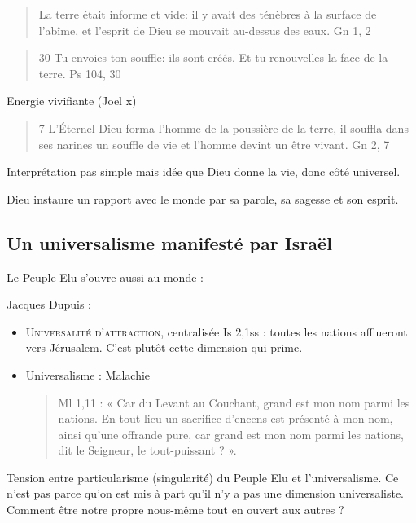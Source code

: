       \begin{quote}
      La terre était informe et vide: il y avait des ténèbres à la surface de l'abîme, et l'esprit de Dieu se mouvait au-dessus des eaux.
          Gn 1, 2 
      \end{quote}
      
      \begin{quote}
      30 Tu envoies ton souffle: ils sont créés, Et tu renouvelles la face de la terre.
          Ps 104, 30
      \end{quote}
      Energie vivifiante (Joel x)
      
      \begin{quote}
      7 L'Éternel Dieu forma l'homme de la poussière de la terre, il souffla dans ses narines un souffle de vie et l'homme devint un être vivant.
          Gn 2, 7
      \end{quote}
  Interprétation pas simple mais idée que Dieu donne la vie, donc côté universel.
  
  \begin{Synthesis}
  Dieu instaure un rapport avec le monde par sa parole, sa sagesse et son esprit.
  \end{Synthesis}
   
    
    \subsection{Un universalisme manifesté par Israël}
    
    Le Peuple Elu s'ouvre aussi au monde : 
    
    Jacques Dupuis :
    \begin{itemize}
        \item \textsc{Universalité d'attraction}, centralisée Is 2,1ss : toutes les nations afflueront vers Jérusalem. C'est plutôt cette dimension qui prime.
        \item Universalisme : Malachie 
        \begin{quote}
            Ml  1,11  :  «  Car  du  Levant  au  Couchant,  grand  est  mon  nom  parmi  les  nations.  En  tout  lieu  un sacrifice  d’encens  est  présenté  à  mon  nom,  ainsi  qu’une  offrande  pure,  car  grand  est  mon  nom parmi  les  nations, dit  le  Seigneur, le  tout-puissant  ?  ». 
        \end{quote}
    \end{itemize}
   
   Tension entre particularisme (singularité) du Peuple Elu et l'universalisme. Ce n'est pas parce qu'on est mis à part qu'il n'y a pas une dimension universaliste. Comment être notre propre nous-même tout en ouvert aux autres ? 
    
